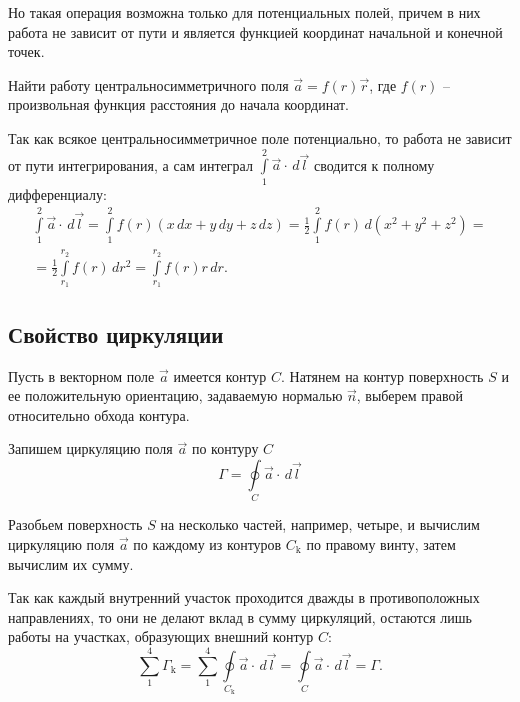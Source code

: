 \begin{enumerate}
	Но такая операция возможна только для потенциальных полей, причем в них работа не зависит от пути и является функцией координат начальной и конечной точек.
	
	\begin{example}
	Найти работу центральносимметричного поля \( \vec{a} = f(r)\vec{r} \), где \( f(r) \) -- произвольная функция расстояния до начала координат.
	\end{example}
	
	\begin{solution}
	
	Так как всякое центральносимметричное поле потенциально, то работа не зависит от пути интегрирования, а сам интеграл \( \int\limits_1^2 \vec{a}\cdot\,d\vec{l} \) сводится к полному дифференциалу:
	\[ \begin{array}{r}
	\int\limits_1^2 \vec{a}\cdot\,d\vec{l} =  \int\limits_1^2 f(r)(x\,d x + y\,d y + z\,d z) = \frac{1}{2}\int\limits_1^2 f(r)\,d (x^2 + y^2 + z^2) = \\
	= \frac{1}{2}\int\limits_{r_1}^{r_2} f(r)\,d r^2 = \int\limits_{r_1}^{r_2} f(r)r\,d r. \end{array} \]
	\end{solution}
	\end{enumerate}

\subsection{Свойство циркуляции}

	Пусть в векторном поле \( \vec{a} \) имеется контур \( C \). Натянем на контур поверхность \( S \) и ее положительную ориентацию, задаваемую нормалью \( \vec{n} \), выберем правой относительно обхода контура.
	
	Запишем циркуляцию поля \( \vec{a} \) по контуру \( C \)
	\[ \Gamma = \oint\limits_C \vec{a}\cdot\,d\vec{l} \]
	
	Разобьем поверхность \( S \) на несколько частей, например, четыре, и вычислим циркуляцию поля \( \vec{a} \) по каждому из контуров \( C_\mathrm{k} \) по правому винту, затем вычислим их сумму.
	
	Так как каждый внутренний участок проходится дважды в противоположных направлениях, то они не делают вклад в сумму циркуляций, остаются лишь работы на участках, образующих внешний контур \( C \):
	\[ \sum\limits_1^4 \Gamma_\mathrm{k} = \sum\limits_1^4 \oint\limits_{C_\mathrm{k}} \vec{a}\cdot\,d\vec{l} = \oint\limits_C \vec{a}\cdot\,d\vec{l} = \Gamma. \]
	
